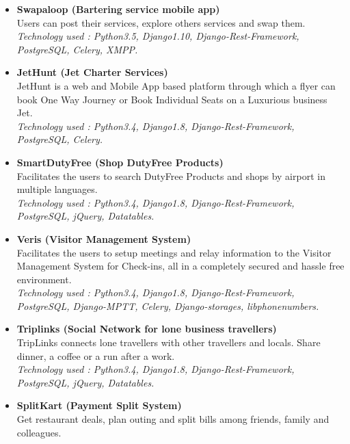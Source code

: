 \documentclass[11pt]{article}
\begin{document}
\begin{itemize}
 \item \textbf{Swapaloop (Bartering service mobile app)}
    \\ Users can post their services, explore others services and swap them.
    \\ \textit{Technology used : Python3.5, Django1.10, Django-Rest-Framework, PostgreSQL, Celery, XMPP.}
 \item \textbf{JetHunt (Jet Charter Services)}
    \\ JetHunt is a web and Mobile App based platform through which a flyer can book One Way Journey or Book Individual Seats on a Luxurious business Jet.
    \\ \textit{Technology used : Python3.4, Django1.8, Django-Rest-Framework, PostgreSQL, Celery.}
 \item \textbf{SmartDutyFree (Shop DutyFree Products)}
    \\ Facilitates the users to search DutyFree Products and shops by airport in multiple languages.
    \\ \textit{Technology used : Python3.4, Django1.8, Django-Rest-Framework, PostgreSQL, jQuery, Datatables.}
 \item \textbf{Veris (Visitor Management System)}
    \\ Facilitates the users to setup meetings and relay information to the Visitor Management System for Check-ins, all in a completely secured and hassle free environment.
    \\ \textit{Technology used : Python3.4, Django1.8, Django-Rest-Framework, PostgreSQL, Django-MPTT, Celery, Django-storages, libphonenumbers.}
 \item \textbf{Triplinks (Social Network for lone business travellers)}
    \\ TripLinks connects lone travellers with other travellers and locals. Share dinner, a coffee or a run after a work.
    \\ \textit{Technology used : Python3.4, Django1.8, Django-Rest-Framework, PostgreSQL, jQuery, Datatables.}
 \item \textbf{SplitKart (Payment Split System)}
    \\ Get restaurant deals, plan outing and split bills among friends, family and colleagues.

\end{itemize}
\end{document}
